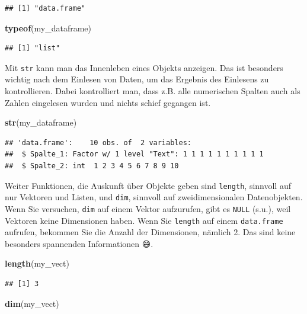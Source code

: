 \documentclass[]{book}
\newenvironment{Shaded}{\begin{snugshade}}{\end{snugshade}}
\newcommand{\KeywordTok}[1]{\textcolor[rgb]{0.13,0.29,0.53}{\textbf{#1}}}
\newcommand{\NormalTok}[1]{#1}
\begin{document}
\begin{verbatim}
## [1] "data.frame"
\end{verbatim}

\begin{Shaded}
\begin{Highlighting}[]
\KeywordTok{typeof}\NormalTok{(my_dataframe)}
\end{Highlighting}
\end{Shaded}

\begin{verbatim}
## [1] "list"
\end{verbatim}

Mit \texttt{str} kann man das Innenleben eines Objekts anzeigen. Das ist besonders wichtig nach dem Einlesen von Daten, um das Ergebnis des Einlesens zu kontrollieren. Dabei kontrolliert man, dass z.B. alle numerischen Spalten auch als Zahlen eingelesen wurden und nichts schief gegangen ist.

\begin{Shaded}
\begin{Highlighting}[]
\KeywordTok{str}\NormalTok{(my_dataframe)}
\end{Highlighting}
\end{Shaded}

\begin{verbatim}
## 'data.frame':    10 obs. of  2 variables:
##  $ Spalte_1: Factor w/ 1 level "Text": 1 1 1 1 1 1 1 1 1 1
##  $ Spalte_2: int  1 2 3 4 5 6 7 8 9 10
\end{verbatim}

Weiter Funktionen, die Auskunft über Objekte geben sind \texttt{length}, sinnvoll auf nur Vektoren und Listen, und \texttt{dim}, sinnvoll auf zweidimensionalen Datenobjekten. Wenn Sie versuchen, \texttt{dim} auf einem Vektor aufzurufen, gibt es \texttt{NULL} (s.u.), weil Vektoren keine Dimensionen haben. Wenn Sie \texttt{length} auf einem \texttt{data.frame} aufrufen, bekommen Sie die Anzahl der Dimensionen, nämlich 2. Das sind keine besonders spannenden Informationen 😄.

\begin{Shaded}
\begin{Highlighting}[]
\KeywordTok{length}\NormalTok{(my_vect)}
\end{Highlighting}
\end{Shaded}

\begin{verbatim}
## [1] 3
\end{verbatim}

\begin{Shaded}
\begin{Highlighting}[]
\KeywordTok{dim}\NormalTok{(my_vect)}
\end{Highlighting}
\end{Shaded}
\end{document}
